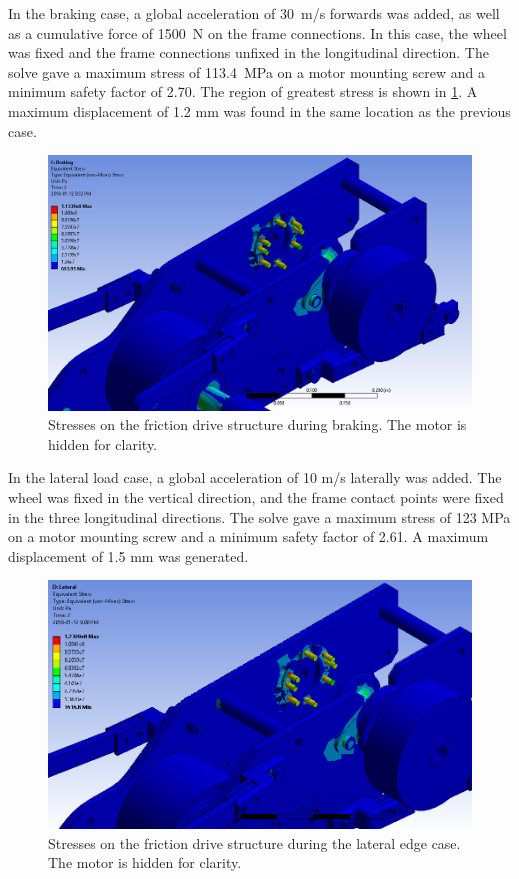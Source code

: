 \documentclass[main.tex]{subfiles}
\begin{document}
In the braking case, a global acceleration of \SI{30}{m/s} forwards was added, as well as a cumulative force of \SI{1500}{N} on the frame connections. In this case, the wheel was fixed and the frame connections unfixed in the longitudinal direction. The solve gave a maximum stress of \SI{113.4}{MPa} on a motor mounting screw and a minimum safety factor of 2.70. The region of greatest stress is shown in \ref{fig:brakestress}. A maximum displacement of 1.2 mm was found in the same location as the previous case.

\begin{figure}[H]
\includegraphics[width=\textwidth]{images/BrakingStress.png}
\caption{Stresses on the friction drive structure during braking. The motor is hidden for clarity.}\label{fig:brakestress}
\end{figure}

In the lateral load case, a global acceleration of 10 m/s laterally was added. The wheel was fixed in the vertical direction, and the frame contact points were fixed in the three longitudinal directions. The solve gave a maximum stress of 123 MPa on a motor mounting screw and a minimum safety factor of 2.61. A maximum displacement of 1.5 mm was generated. 

\begin{figure}[H]
\includegraphics[width=\textwidth]{images/LateralStress.png}
\caption{Stresses on the friction drive structure during the lateral edge case. The motor is hidden for clarity.}\label{fig:latstress}
\end{figure}
\end{document}
